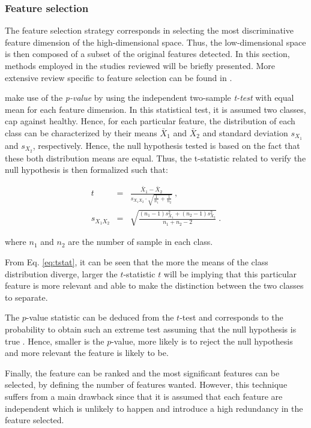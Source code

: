 \subsubsection{Feature selection}\label{subsubsec:featsel}

The feature selection strategy corresponds in selecting the most discriminative feature dimension of the high-dimensional space. Thus, the low-dimensional space is then composed of a subset of the original features detected. In this section, methods employed in the studies reviewed will be briefly presented. More extensive review specific to feature selection can be found in \cite{Saeys2007}.

\cite{Niaf2011,Niaf2012} make use of the \textit{p-value} by using the independent two-sample \textit{t-test} with equal mean for each feature dimension. In this statistical test, it is assumed two classes, \ac{cap} against healthy. Hence, for each particular feature, the distribution of each class can be characterized by their means $\bar{X}_1$ and $\bar{X}_2$ and standard deviation $s_{X_1}$ and $s_{X_2}$, respectively. Hence, the null hypothesis tested is based on the fact that these both distribution means are equal. Thus, the t-statistic related to verify the null hypothesis is then formalized such that:

\begin{eqnarray}
t & = & \frac{\bar {X}_1 - \bar{X}_2}{s_{X_1X_2} \cdot \sqrt{\frac{1}{n_1}+\frac{1}{n_2}}} \ , \label{eq:tstat} \\
s_{X_1X_2} & = & \sqrt{\frac{(n_1-1)s_{X_1}^2+(n_2-1)s_{X_2}^2}{n_1+n_2-2}} \ . \nonumber
\end{eqnarray}

\noindent where $n_1$ and $n_2$ are the number of sample in each class.

From Eq. \ref{eq:tstat}, it can be seen that the more the means of the class distribution diverge, larger the $t$-statistic $t$ will be implying that this particular feature is more relevant and able to make the distinction between the two classes to separate. 

The $p$-value statistic can be deduced from the $t$-test and corresponds to the probability to obtain such an extreme test assuming that the null hypothesis is true \cite{Goodman1999}. Hence, smaller is the $p$-value, more likely is to reject the null hypothesis and more relevant the feature is likely to be.

Finally, the feature can be ranked and the most significant features can be selected, by defining the number of features wanted. However, this technique suffers from a main drawback since that it is assumed that each feature are independent which is unlikely to happen and introduce a high redundancy in the feature selected.

